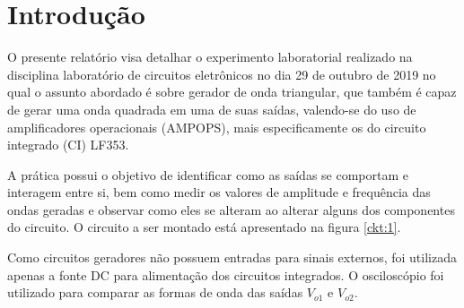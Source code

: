 \section{Introdução}




O presente relatório visa detalhar o experimento laboratorial realizado na disciplina laboratório de circuitos eletrônicos no dia 29 de outubro de 2019 no qual o assunto abordado é sobre gerador de onda triangular, que também é capaz de gerar uma onda quadrada em uma de suas saídas, valendo-se do uso de amplificadores operacionais (AMPOPS), mais especificamente os do circuito integrado (CI) LF353. 

A prática possui o objetivo de identificar como as saídas se comportam e interagem entre si, bem como medir os valores de amplitude e frequência das ondas geradas e observar como eles se alteram ao alterar alguns dos componentes do circuito. O circuito a ser montado está apresentado na figura \ref{ckt:1}.



Como circuitos geradores não possuem entradas para sinais externos, foi utilizada apenas a fonte DC para alimentação dos circuitos integrados. O osciloscópio foi utilizado para comparar as formas de onda das saídas $V_{o1}$ e $V_{o2}$.